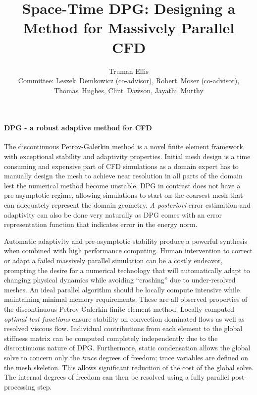 \documentclass[letterpaper]{article}
\title{Space-Time DPG: Designing a Method for Massively Parallel CFD}
\author{Truman Ellis\\
Committee: Leszek~Demkowicz (co-advisor), Robert~Moser (co-advisor), Thomas~Hughes, Clint~Dawson, Jayathi~Murthy}
\date{}
\begin{document}
\maketitle

\paragraph{DPG - a robust adaptive method for CFD}
The discontinuous Petrov-Galerkin method\cite{DPGOverview} is a novel finite element framework with exceptional stability and adaptivity properties.
Initial mesh design is a time consuming and expensive part of CFD simulations as a domain expert has to manually design the 
mesh to achieve near resolution in all parts of the domain lest the numerical method become unstable.
DPG in contrast does not have a pre-asymptotic regime, allowing simulations to start on the coarsest mesh that can adequately represent the domain geometry.
\emph{A posteriori} error estimation and adaptivity can also be done very naturally as DPG comes with an error representation function 
that indicates error in the energy norm.

Automatic adaptivity and pre-asymptotic stability produce a powerful synthesis when combined with high performance computing.
Human intervention to correct or adapt a failed massively parallel simulation can be a costly endeavor, prompting the desire for a
numerical technology that will automatically adapt to changing physical dynamics while avoiding ``crashing'' due to under-resolved meshes.
An ideal parallel algorithm should be locally compute intensive while maintaining minimal memory requirements\cite{BlastWebPage}.
These are all observed properties of the discontinuous Petrov-Galerkin finite element method.
Locally computed \emph{optimal test functions} ensure stability on convection dominated flows as well as resolved viscous flow.
Individual contributions from each element to the global stiffness matrix can be computed completely independently due to the discontinuous nature of DPG.
Furthermore, static condensation allows the global solve to concern only the \emph{trace} degrees of freedom; 
trace variables are defined on the mesh skeleton.  
This allows significant reduction of the cost of the global solve.  
The internal degrees of freedom can then be resolved using a fully parallel post-processing step.
\end{document}
